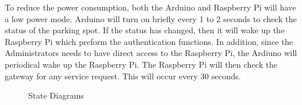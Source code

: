 \documentclass[paper=a4, fontsize=12pt]{scrartcl}
\numberwithin{equation}{section}		%
\numberwithin{figure}{section}			%
\numberwithin{table}{section}				%
\begin{document}
To reduce the power consumption, both the Arduino and Raspberry Pi will have a low power mode. Arduino will turn on briefly every 1 to 2 seconds to check the status of the parking spot. If the status has changed, then it will wake up the Raspberry Pi which preform the authentication functions. In addition, since the Administrators needs to have direct access to the Raspberry Pi, the Ardiuno will periodical wake up the Raspberry Pi. The Raspberry Pi will then check the gateway for any service request. This will occur every 30 seconds. 

\begin{figure}[t]
    \centering
    \qquad
    \caption{State Diagrams}%
    \label{fig:hardware_state}%
\end{figure}
\end{document}
